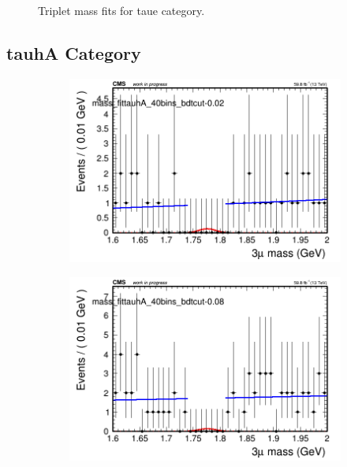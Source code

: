 \begin{figure}[H]
\begin{subfigure}{0.2\textwidth}
        \caption{}
    \end{subfigure}
    \caption{Triplet mass fits for taue category.}
    \label{fig:unfixedexptaue}
\end{figure}

\subsection{tauhA Category}
\label{sec:unfixedexptauhA}

\begin{figure}[H]
    \centering
    \begin{subfigure}{0.2\textwidth}
        \includegraphics[width=\textwidth]{unfixed_exp/plots/tauhA/massfit_tauhA_40bins_bdtcut-0.02.png}
        \caption{}
    \end{subfigure}
    \begin{subfigure}{0.2\textwidth}
        \includegraphics[width=\textwidth]{unfixed_exp/plots/tauhA/massfit_tauhA_40bins_bdtcut-0.08.png}

\end{subfigure}
\end{figure}
